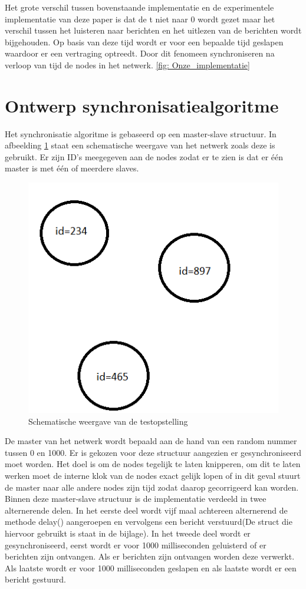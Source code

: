 \documentclass{article}
\begin{document}
Het grote verschil tussen bovenstaande implementatie en de experimentele implementatie van deze paper is dat de t niet naar 0 wordt gezet maar het verschil tussen het luisteren naar berichten en het uitlezen van de berichten wordt bijgehouden. Op basis van deze tijd wordt er voor een bepaalde tijd geslapen waardoor er een vertraging optreedt. Door dit fenomeen synchroniseren na verloop van tijd de nodes in het netwerk. 
\ref{fig: Onze_implementatie}

\newpage
\section{Ontwerp synchronisatiealgoritme}
Het synchronisatie algoritme is gebaseerd op een master-slave structuur. In afbeelding \ref{fig: Schematisch} staat een schematische weergave van het netwerk zoals deze is gebruikt. Er zijn ID's meegegeven aan de nodes zodat er te zien is dat er \'{e}\'{e}n master is met \'{e}\'{e}n of meerdere slaves. 
\begin{figure}[h]
\centering\includegraphics[scale=0.5]{testopstelling}
\caption{Schematische weergave van de testopstelling}
\label{fig: Schematisch}
\end{figure}
De master van het netwerk wordt bepaald aan de hand van een random nummer tussen 0 en 1000. Er is gekozen voor deze structuur aangezien er gesynchroniseerd moet worden. Het doel is om de nodes tegelijk te laten knipperen, om dit te laten werken moet de interne klok van de nodes exact gelijk lopen of in dit geval stuurt de master naar alle andere nodes zijn tijd zodat daarop gecorrigeerd kan worden. Binnen deze master-slave structuur is de implementatie verdeeld in twee alternerende delen.
In het eerste deel wordt vijf maal achtereen alternerend de methode delay() aangeroepen en vervolgens een bericht verstuurd(De struct die hiervoor gebruikt is staat in de bijlage).
In het tweede deel wordt er gesynchroniseerd, eerst wordt er voor 1000 milliseconden geluisterd of er berichten zijn ontvangen. Als er berichten zijn ontvangen worden deze verwerkt. Als laatste wordt er voor 1000 milliseconden geslapen en als laatste wordt er een bericht gestuurd. 
\end{document}
